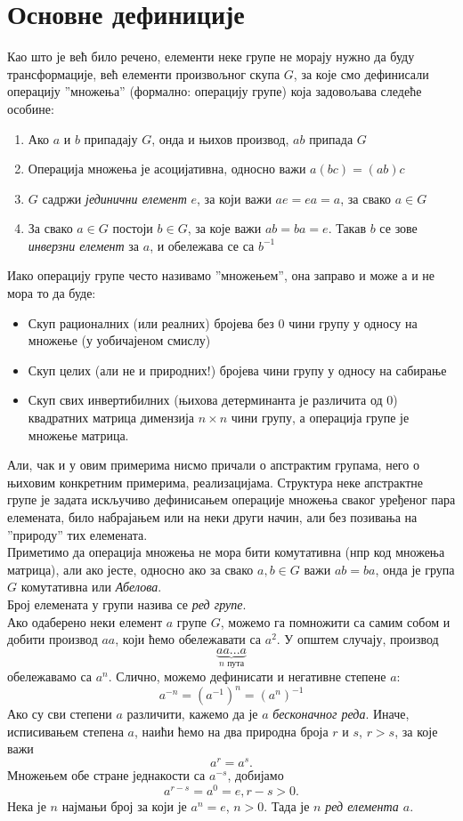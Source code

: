 \documentclass{report}
\theoremstyle{plain}
\theoremstyle{definition}
\begin{document}
\section{Основне дефиниције}
Као што је већ било речено, елементи неке групе не морају нужно да буду трансформације, већ елементи произвољног скупа $G$, за које смо дефинисали операцију ''множења'' (формално: операцију групе) која задовољава следеће особине:
\begin{enumerate}
  \item Ако $a$ и $b$ припадају $G$, онда и њихов производ, $ab$ припада $G$
  \item Операција множења је асоцијативна, односно важи $a(bc) = (ab)c$
  \item $G$ садржи \emph{јединични елемент} $e$, за који важи $ae = ea = a$, за свако $a\in G$
  \item За свако $a\in G$ постоји $b\in G$, за које важи $ab = ba = e$. Такав $b$ се зове \emph{инверзни елемент} за $a$, и обележава се са $b^{-1}$
\end{enumerate}
Иако операцију групе често називамо ''множењем'', она заправо и може а и не мора то да буде:
\begin{itemize}
  \item Скуп рационалних (или реалних) бројева без $0$ чини групу у односу на множење (у уобичајеном смислу)
  \item Скуп целих (али не и природних!) бројева чини групу у односу на сабирање
  \item Скуп свих инвертибилних (њихова детерминанта је различита од $0$) квадратних матрица димензија $n\times n$ чини групу, а операција групе је множење матрица.
\end{itemize}
Али, чак и у овим примерима нисмо причали о апстрактим групама, него о њиховим конкретним примерима, реализацијама. Структура неке апстрактне групе је задата искључиво дефинисањем операције множења сваког уређеног пара елемената, било набрајањем или на неки други начин, али без позивања на ''природу'' тих елемената.\\
Приметимо да операција множења не мора бити комутативна (нпр код множења матрица), али ако јесте, односно ако за свако $a, b\in G$ важи $ab = ba$, онда је група $G$ комутативна или \emph{Абелова}.\\
Број елемената у групи назива се \emph{ред групе}.\\
Ако одаберено неки елемент $a$ групе $G$, можемо га помножити са самим собом и добити производ $aa$, који ћемо обележавати са $a^2$. У општем случају, производ $$\underbrace{aa...a}_{n\text{ пута}}$$ обележавамо са $a^n$. Слично, можемо дефинисати и негативне степене $a$:
$$a^{-n} = (a^{-1})^n = (a^n)^{-1}$$
Ако су сви степени $a$ различити, кажемо да је $a$ \emph{бесконачног реда}. Иначе, исписивањем степена $a$, наићи ћемо на два природна броја $r$ и $s$, $r>s$, за које важи
$$a^r = a^s.$$
Множењем обе стране једнакости са $a^{-s}$, добијамо
$$a^{r-s} = a^0 = e, r-s>0.$$
Нека је $n$ најмањи број за који је $a^n = e$, $n>0$. Тада је $n$ \emph{ред елемента $a$}.
\end{document}
